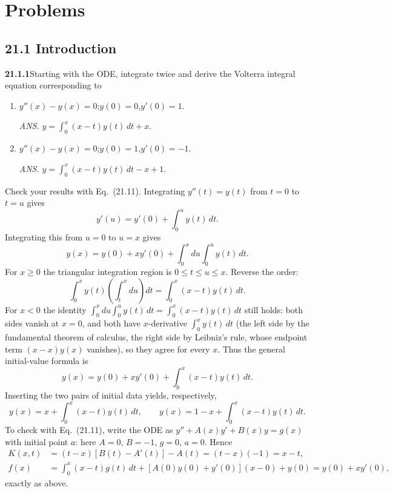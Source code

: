 
\section*{Problems}

\subsection*{21.1 Introduction}

\par\bigskip
\noindent\textbf{21.1.1}\quad Starting with the ODE, integrate
twice and derive the Volterra integral equation corresponding to
\begin{enumerate}
\item[(a)] $y''(x)-y(x)=0$;\quad $y(0)=0$,\quad $y'(0)=1$.
\par\nobreak\hfill\emph{ANS.}\enspace
$y=\displaystyle\int_{0}^{x}(x-t)y(t)\,dt+x$.
\item[(b)] $y''(x)-y(x)=0$;\quad $y(0)=1$,\quad $y'(0)=-1$.
\par\nobreak\hfill\emph{ANS.}\enspace
$y=\displaystyle\int_{0}^{x}(x-t)y(t)\,dt-x+1$.
\end{enumerate}
Check your results with Eq.~(21.11).
\solution
Integrating $y''(t)=y(t)$ from $t=0$ to $t=u$ gives
\[
y'(u)=y'(0)+\int_0^u y(t)\,dt.
\]
Integrating this from $u=0$ to $u=x$ gives
\[
y(x)=y(0)+xy'(0)+\int_0^xdu\int_0^u y(t)\,dt.
\]
For $x\ge0$ the triangular integration region is
$0\le t\le u\le x$. Reverse the order:
\[
\int_0^x y(t)\left(\int_t^xdu\right)dt
=\int_0^x(x-t)y(t)\,dt.
\]
For $x<0$ the identity
$\int_0^xdu\int_0^uy(t)\,dt=\int_0^x(x-t)y(t)\,dt$ still holds: both
sides vanish at $x=0$, and both have $x$-derivative $\int_0^xy(t)\,dt$
(the left side by the fundamental theorem of calculus, the right side by
Leibniz's rule, whose endpoint term $(x-x)y(x)$ vanishes), so they agree
for every $x$.
Thus the general initial-value formula is
\[
y(x)=y(0)+xy'(0)+\int_0^x(x-t)y(t)\,dt.
\]
Inserting the two pairs of initial data yields, respectively,
\[
\boxed{y(x)=x+\int_0^x(x-t)y(t)\,dt},\qquad
\boxed{y(x)=1-x+\int_0^x(x-t)y(t)\,dt}.
\]
To check with Eq.~(21.11), write the ODE as $y''+A(x)y'+B(x)y=g(x)$
with initial point $a$: here $A=0$, $B=-1$, $g=0$, $a=0$. Hence
\[
\begin{aligned}
K(x,t)&=(t-x)[B(t)-A'(t)]-A(t)=(t-x)(-1)=x-t,\\
f(x)&=\int_0^x(x-t)g(t)\,dt+[A(0)y(0)+y'(0)](x-0)+y(0)
=y(0)+xy'(0),
\end{aligned}
\]
exactly as above.


